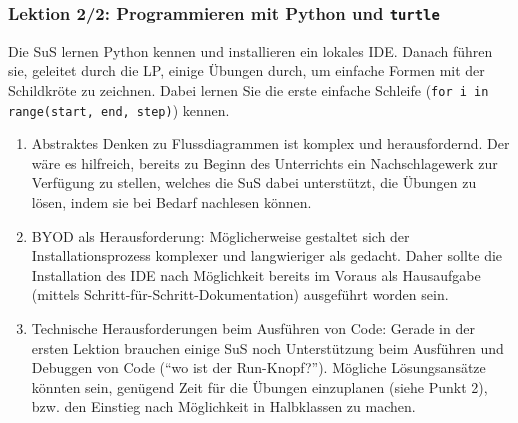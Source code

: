 \begin{myExBox}[title=DL \themycounter]
\subsubsection*{Lektion 2/2: Programmieren mit Python und \lstinline|turtle|}
Die SuS lernen Python kennen und installieren ein lokales IDE. Danach führen sie, geleitet durch die LP, einige Übungen durch, um einfache Formen mit der Schildkröte zu zeichnen. Dabei lernen Sie die erste einfache Schleife (\lstinline|for i in range(start, end, step)|) kennen.

\begin{myExBox}[title=Mögliche Schwierigkeiten \& geeignete Massnahmen]
\begin{enumerate}
    \item Abstraktes Denken zu Flussdiagrammen ist komplex und herausfordernd. Der wäre es hilfreich, bereits zu Beginn des Unterrichts ein Nachschlagewerk zur Verfügung zu stellen, welches die SuS dabei unterstützt, die Übungen zu lösen, indem sie bei Bedarf nachlesen können.
    \item BYOD als Herausforderung: Möglicherweise gestaltet sich der Installationsprozess komplexer und langwieriger als gedacht. Daher sollte die Installation des IDE nach Möglichkeit bereits im Voraus als Hausaufgabe (mittels Schritt-für-Schritt-Dokumentation) ausgeführt worden sein.
    \item Technische Herausforderungen beim Ausführen von Code: Gerade in der ersten Lektion brauchen einige SuS noch Unterstützung beim Ausführen und Debuggen von Code (\enquote{wo ist der Run-Knopf?}). Mögliche Lösungsansätze könnten sein, genügend Zeit für die Übungen einzuplanen (siehe Punkt 2), bzw. den Einstieg nach Möglichkeit in Halbklassen zu machen. 
\end{enumerate}
\end{myExBox}
\end{myExBox}
\newpage{}


